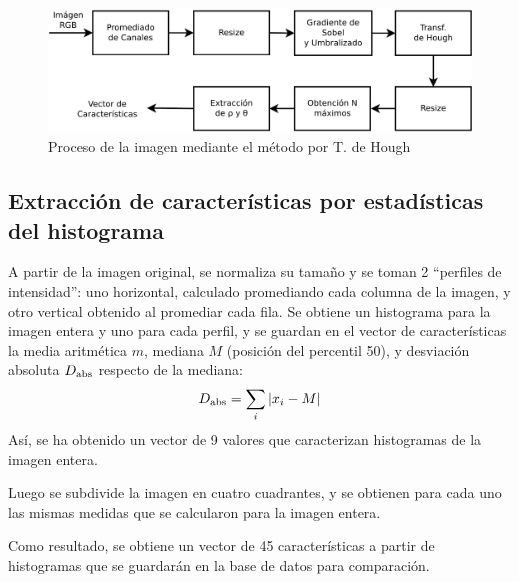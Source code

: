 \documentclass[conference,spanish,a4paper,10pt,oneside,final]{tfmpd}
\begin{document}
\begin{figure}
\begin{center}
\includegraphics[scale=0.25]{../diagramas/procesohough} 
\end{center}
\caption{Proceso de la imagen mediante el método por T. de Hough}
\label{procesohough}
\end{figure}
%
%
\subsection*{Extracción de características por estadísticas del histograma}
A partir de la imagen original, se normaliza su tamaño y se toman 2 ``perfiles
de intensidad'': uno horizontal, calculado promediando cada columna de la
imagen, y otro vertical obtenido al promediar cada fila. Se obtiene un
histograma para la imagen entera y uno para cada perfil, y se guardan en el
vector de características la media aritmética $m$, mediana $M$ (posición del
percentil 50),  y desviación absoluta $D_{\textrm{abs}}$ respecto de la mediana:
\begin{equation*}
D_{\textrm{abs}}=\sum_i |x_i - M|
\end{equation*}
Así, se ha obtenido un vector de 9 valores que caracterizan histogramas de la
imagen entera.

Luego se subdivide la imagen en cuatro cuadrantes, y se obtienen para cada uno
las mismas medidas que se calcularon para la imagen entera.

Como resultado, se obtiene un vector de 45 características a partir de
histogramas que se
guardarán en la base de datos para comparación.
\end{document}
